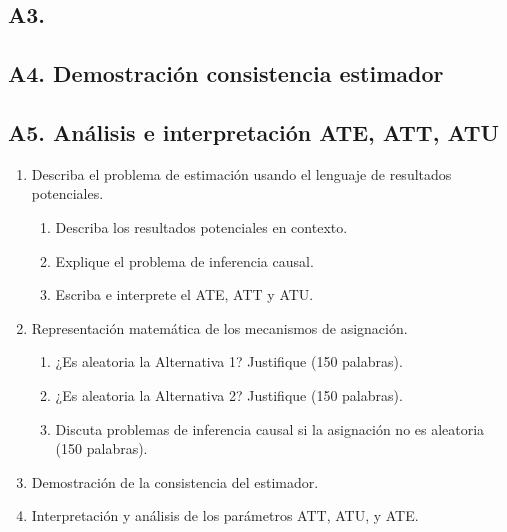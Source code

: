 \documentclass[12pt, letter]{article}
\begin{document}
\subsection{A3. }
\subsection{A4. Demostración consistencia estimador}
\subsection{A5. Análisis e interpretación ATE, ATT, ATU}

\begin{enumerate}[label=A.\arabic*]
    \item Describa el problema de estimación usando el lenguaje de resultados potenciales.
    \begin{enumerate}[label=A.1.\alph*]
        \item Describa los resultados potenciales en contexto.
        \item Explique el problema de inferencia causal.
        \item Escriba e interprete el ATE, ATT y ATU.
    \end{enumerate}


    \item Representación matemática de los mecanismos de asignación.
    \begin{enumerate}[label=A.2.\alph*]
        \item ¿Es aleatoria la Alternativa 1? Justifique (150 palabras).
        \item ¿Es aleatoria la Alternativa 2? Justifique (150 palabras).
        \item Discuta problemas de inferencia causal si la asignación no es aleatoria (150 palabras).
    \end{enumerate}
    \item Demostración de la consistencia del estimador.
    \item Interpretación y análisis de los parámetros ATT, ATU, y ATE.
\end{enumerate}







                                 
\end{document}
